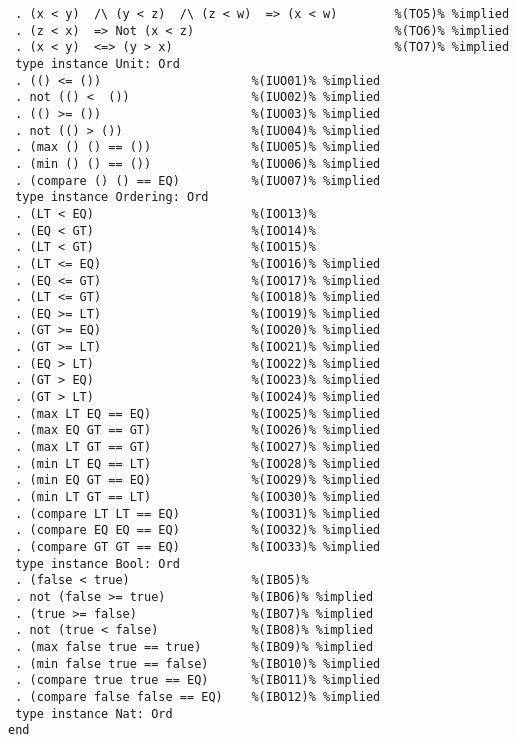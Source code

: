 \begin{Verbatim}
 . (x < y)  /\ (y < z)  /\ (z < w)  => (x < w)        %(TO5)% %implied
 . (z < x)  => Not (x < z)                            %(TO6)% %implied
 . (x < y)  <=> (y > x)                               %(TO7)% %implied
 type instance Unit: Ord
 . (() <= ())                     %(IUO01)% %implied
 . not (() <  ())                 %(IUO02)% %implied
 . (() >= ())                     %(IUO03)% %implied
 . not (() > ())                  %(IUO04)% %implied
 . (max () () == ())              %(IUO05)% %implied
 . (min () () == ())              %(IUO06)% %implied
 . (compare () () == EQ)          %(IUO07)% %implied
 type instance Ordering: Ord
 . (LT < EQ)                      %(IOO13)%
 . (EQ < GT)                      %(IOO14)%
 . (LT < GT)                      %(IOO15)%
 . (LT <= EQ)                     %(IOO16)% %implied
 . (EQ <= GT)                     %(IOO17)% %implied
 . (LT <= GT)                     %(IOO18)% %implied
 . (EQ >= LT)                     %(IOO19)% %implied
 . (GT >= EQ)                     %(IOO20)% %implied
 . (GT >= LT)                     %(IOO21)% %implied
 . (EQ > LT)                      %(IOO22)% %implied
 . (GT > EQ)                      %(IOO23)% %implied
 . (GT > LT)                      %(IOO24)% %implied
 . (max LT EQ == EQ)              %(IOO25)% %implied
 . (max EQ GT == GT)              %(IOO26)% %implied
 . (max LT GT == GT)              %(IOO27)% %implied
 . (min LT EQ == LT)              %(IOO28)% %implied
 . (min EQ GT == EQ)              %(IOO29)% %implied
 . (min LT GT == LT)              %(IOO30)% %implied
 . (compare LT LT == EQ)          %(IOO31)% %implied
 . (compare EQ EQ == EQ)          %(IOO32)% %implied
 . (compare GT GT == EQ)          %(IOO33)% %implied
 type instance Bool: Ord
 . (false < true)                 %(IBO5)%
 . not (false >= true)            %(IBO6)% %implied
 . (true >= false)                %(IBO7)% %implied
 . not (true < false)             %(IBO8)% %implied
 . (max false true == true)       %(IBO9)% %implied
 . (min false true == false)      %(IBO10)% %implied
 . (compare true true == EQ)      %(IBO11)% %implied
 . (compare false false == EQ)    %(IBO12)% %implied
 type instance Nat: Ord
end
\end{Verbatim}

